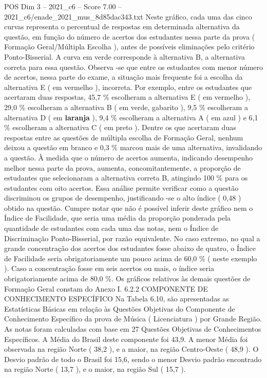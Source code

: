 \begin{textsample}{POS Dim 3 – 2021\_c6 – Score 7.00 – 2021\_c6/enade\_2021\_mus\_8d85dac343.txt}
Neste gráfico, cada uma das cinco curvas representa o percentual de respostas em determinada alternativa da questão, em função do número de acertos dos estudantes nessa parte da prova ( Formação Geral/Múltipla Escolha ), antes de possíveis eliminações pelo critério Ponto-Bisserial.
A curva em verde corresponde à alternativa B, a alternativa correta para essa questão.
Observa -se que entre os estudantes com menor número de acertos, nessa parte do exame, a situação mais frequente foi a escolha da alternativa E ( em vermelho ), incorreta.
Por exemplo, entre os estudantes que acertaram duas respostas, 45,7 \% escolheram a alternativa E ( em vermelho ), 29,0 \% escolheram a alternativa B ( em verde, gabarito ), 9,5 \% escolheram a alternativa D ( em \textbf{laranja} ), 9,4 \% escolheram a alternativa A ( em azul ) e 6,1 \% escolheram a alternativa C ( em preto ).
Dentre os que acertaram duas respostas entre as questões de múltipla escolha de Formação Geral, nenhum deixou a questão em branco e 0,3 \% marcou mais de uma alternativa, invalidando a questão.
À medida que o número de acertos aumenta, indicando desempenho melhor nessa parte da prova, aumenta, concomitantemente, a proporção de estudantes que selecionaram a alternativa correta B, atingindo 100 \% para os estudantes com oito acertos.
Essa análise permite verificar como a questão discriminou os grupos de desempenho, justificando -se o alto índice ( 0,48 ) obtido na questão.
Cumpre notar que não é possível inferir deste gráfico nem o Índice de Facilidade, que seria uma média da proporção ponderada pela quantidade de estudantes com cada uma das notas, nem o Índice de Discriminação Ponto-Bisserial, por razão equivalente.
No caso extremo, no qual a grande concentração dos acertos dos estudantes fosse abaixo de quatro, o Índice de Facilidade seria obrigatoriamente um pouco acima de 60,0 \% ( neste exemplo ).
Caso a concentração fosse em seis acertos ou mais, o índice seria obrigatoriamente acima de 80,0 \%.
Os gráficos relativos às demais questões de Formação Geral constam do Anexo I. 6.2.2 COMPONENTE DE CONHECIMENTO ESPECÍFICO Na Tabela 6.10, são apresentadas as Estatísticas Básicas em relação às Questões Objetivas do Componente de Conhecimento Específico da prova de Música ( Licenciatura ) por Grande Região.
As notas foram calculadas com base em 27 Questões Objetivas de Conhecimentos Específicos.
A Média do Brasil deste componente foi 43,9.
A menor Média foi observada na região Norte ( 38,2 ), e a maior, na região Centro-Oeste ( 48,9 ).
O Desvio padrão de todo o Brasil foi 15,6, sendo o menor Desvio padrão encontrado na região Norte ( 13,7 ), e o maior, na região Sul ( 15,7 ).

\end{textsample}
